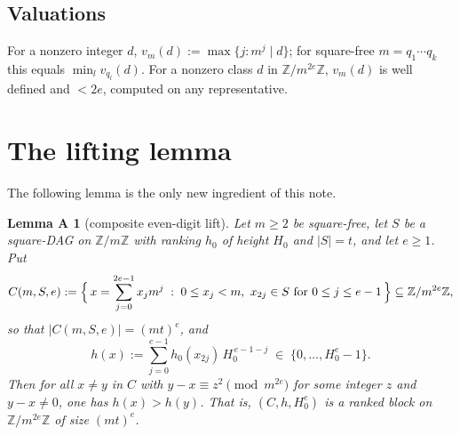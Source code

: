 \documentclass[11pt]{amsart}
\theoremstyle{plain}
\newtheorem*{lemA}{Lemma A}
\theoremstyle{remark}
\newcommand{\Z}{\mathbb{Z}}
\begin{document}
\subsection*{Valuations}
For a nonzero integer $d$, $v_m(d) := \max\{ j : m^j \mid d \}$; for
square-free $m = q_1 \cdots q_k$ this equals $\min_l v_{q_l}(d)$. For a
nonzero class $d$ in $\Z/m^{2e}\Z$, $v_m(d)$ is well defined and $< 2e$,
computed on any representative.

\section{The lifting lemma}\label{sec:lemA}

The following lemma is the only new ingredient of this note.

\begin{lemA}[composite even-digit lift]
Let $m \ge 2$ be square-free, let $S$ be a square-DAG on $\Z/m\Z$ with
ranking $h_0$ of height $H_0$ and $|S| = t$, and let $e \ge 1$. Put
\[
C(m,S,e) := \Bigl\{\, x = \sum_{j=0}^{2e-1} x_j m^j \;:\;
0 \le x_j < m,\ x_{2j} \in S \text{ for } 0 \le j \le e-1 \,\Bigr\}
\subseteq \Z/m^{2e}\Z,
\]
so that $|C(m,S,e)| = (mt)^e$, and
\[
h(x) := \sum_{j=0}^{e-1} h_0(x_{2j}) \, H_0^{\,e-1-j}
\;\in\; \{0,\dots,H_0^e - 1\}.
\]
Then for all $x \ne y$ in $C$ with $y - x \equiv z^2 \pmod{m^{2e}}$ for some
integer $z$ and $y - x \ne 0$, one has $h(x) > h(y)$. That is,
$(C, h, H_0^e)$ is a ranked block on $\Z/m^{2e}\Z$ of size $(mt)^e$.
\end{lemA}
\end{document}
